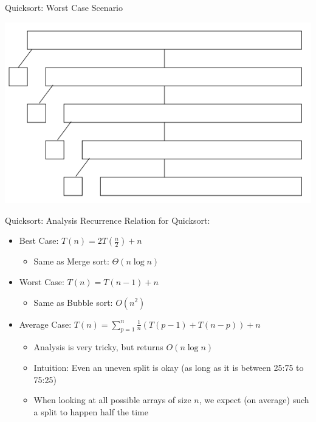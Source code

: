 \documentclass{beamer}
\begin{document}
\begin{frame}{Quicksort: Worst Case Scenario}
\begin{center}
    \includegraphics[scale=0.4]{quickSortWorstCase.png}
\end{center}
\end{frame}


\begin{frame}{Quicksort: Analysis}
Recurrence Relation for Quicksort:
\begin{itemize}
    \item Best Case: $T(n) = 2T(\frac{n}{2}) + n$ 
    \begin{itemize}
        \item Same as Merge sort: $\Theta(n \log n)$
    \end{itemize}
    \item Worst Case: $T(n) = T(n-1) + n$ 
    \begin{itemize}
        \item Same as Bubble sort: $O(n^2)$
    \end{itemize}
    \item Average Case: $T(n) = \sum_{p=1}^{n} \frac{1}{n} \left( T(p-1) + T(n-p) \right) + n$
    \begin{itemize}
        \item Analysis is very tricky, but returns $O(n \log n)$
        \item Intuition: Even an uneven split is okay (as long as it is between 25:75 to 75:25)
        \item When looking at all possible arrays of size $n$, we expect (on average) such a split to happen half the time 
    \end{itemize}

\end{itemize}
\end{frame}
\end{document}
